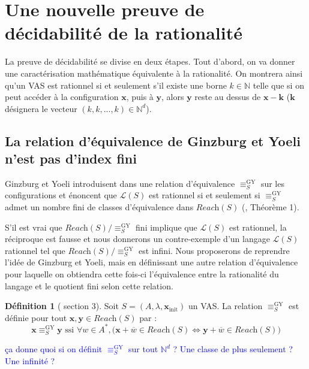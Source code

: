 \documentclass[a4paper,final]{article}
\theoremstyle{definition}
\newtheorem{Definition}[Theorem]{Définition}
\newcommand{\alain}[1]{\textcolor{blue}{#1}}
\newcommand{\N}{\ensuremath{\mathbb{N}}}
\newcommand{\lang}{\ensuremath{\mathcal{L}}}
\newcommand{\reach}{\ensuremath{\textit{Reach}}}
\newcommand{\vect}[1]{\ensuremath{\mathbf{#1}}}
\newcommand{\relGY}{\ensuremath{\equiv^\text{GY}_S}}
\newcommand{\ssi}{\ensuremath{\text{ ssi }}}
\newcommand{\equivaut}{\ensuremath{\Leftrightarrow}}
\newcommand{\xinit}{\ensuremath{\vect{x}_\text{init}}}
\newcommand{\valeur}[1]{\ensuremath{\overline{#1}}}
\begin{document}

\section{Une nouvelle preuve de décidabilité de la rationalité}

La preuve de décidabilité se divise en deux étapes.
Tout d'abord, on va donner une caractérisation mathématique équivalente à la rationalité.
On montrera ainsi qu'un VAS est rationnel si et seulement s'il existe une borne $k\in\N$ telle que si on peut accéder à la configuration $\vect{x}$, puis à $\vect{y}$, alors $\vect{y}$ reste au dessus de $\vect{x}-\vect{k}$
($\vect{k}$ désignera le vecteur $(k,k,...,k)\in\N^d$).

\iffalse
\subsection{La relation d'équivalence de Ginzburg et Yoeli n'est pas d'index fini}

Ginzburg et Yoeli introduisent dans \cite{giyo80} une relation d'équivalence $\relGY$ sur les configurations et énoncent que $\lang(S)$ est rationnel si et seulement si $\relGY$ admet un nombre fini de classes d'équivalence dans $\reach(S)$ (\cite{giyo80}, Théorème 1).

S'il est vrai que $\reach(S)/\relGY$ fini implique que $\lang(S)$ est rationnel, la réciproque est fausse et nous donnerons un contre-exemple d'un langage $\lang(S)$ rationnel tel que $\reach(S)/\relGY$ est infini. 
Nous proposerons de reprendre l'idée de Ginzburg et Yoeli,
mais en définissant une autre relation d'équivalence pour laquelle on obtiendra cette fois-ci l'équivalence entre la rationalité du langage et le quotient fini selon cette relation.

\begin{Definition}[\cite{giyo80} section 3]
Soit $S=(A,\lambda,\xinit)$ un VAS. La relation $\relGY$ est définie pour tout $\vect{x},\vect{y} \in\reach(S)$ par : 
$$\vect{x}\relGY\vect{y} \ssi \forall w\in A^\ast, \big( \vect{x} +\valeur{w}\in\reach(S) \equivaut \vect{y} +\valeur{w}\in\reach(S) \big)$$
\end{Definition}
\alain{ça donne quoi si on définit $\relGY$ sur tout $\N^d$ ? Une classe de plus seulement ? Une infinité ?}
\end{document}
